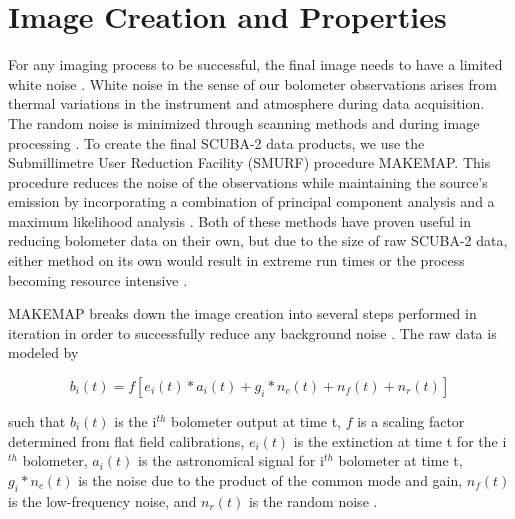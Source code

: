 \section{Image Creation and Properties}\label{sc2_imgs}

For any imaging process to be successful, the final image needs to have a limited white noise \citep{chapin2013}.  White noise in the sense of our bolometer observations arises from thermal variations in the instrument and atmosphere during data acquisition. The random noise is minimized through scanning methods and during image processing \citep{chapin2013}.  To create the final SCUBA-2 data products, we use the Submillimetre User Reduction Facility (SMURF) procedure MAKEMAP.  This procedure reduces the noise of the observations while maintaining the source's emission by incorporating a combination of principal component analysis and a maximum likelihood analysis \citep{chapin2013}.  Both of these methods have proven useful in reducing bolometer data on their own, but due to the size of raw SCUBA-2 data, either method on its own would result in extreme run times or the process becoming resource intensive \citep{chapin2013}.


MAKEMAP breaks down the image creation into several steps performed in iteration in order to successfully reduce any background noise \citep{chapin2013}.  The raw data is modeled by 

\begin{equation}\label{eq:sc2_raw}
  b_i(t) = f \left[ e_i(t)*a_i(t) + g_i*n_c(t)+n_f(t)+n_r(t)\right]
\end{equation}

\noindent such that $b_i(t)$ is the i$^{th}$ bolometer output at time t, $f$ is a scaling factor determined from flat field calibrations, $e_i(t)$ is the extinction at time t for the i$^{th}$ bolometer, $a_i(t)$ is the astronomical signal for i$^{th}$ bolometer at time t,  $g_i*n_c(t)$ is the noise due to the product of the common mode and gain,  $n_f(t)$ is the low-frequency noise, and  $n_r(t)$ is the random noise \citep{chapin2013}.

